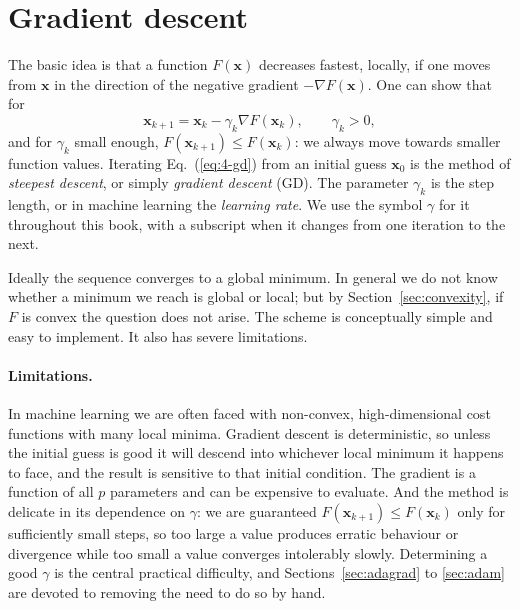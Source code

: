 \section{Gradient descent}
\label{sec:graddescent}

The basic idea is that a function $F(\bm{x})$ decreases fastest, locally, if
one moves from $\bm{x}$ in the direction of the negative gradient
$-\nabla F(\bm{x})$.  One can show that for
\begin{equation}
  \bm{x}_{k+1} = \bm{x}_k - \gamma_k\nabla F(\bm{x}_k),
  \qquad \gamma_k>0,
  \label{eq:4-gd}
\end{equation}
and for $\gamma_k$ small enough, $F(\bm{x}_{k+1})\le F(\bm{x}_k)$: we always
move towards smaller function values.  Iterating Eq.~(\ref{eq:4-gd}) from an
initial guess $\bm{x}_0$ is the method of \emph{steepest descent}, or simply
\emph{gradient descent} (GD).  The parameter $\gamma_k$ is the step length, or
in machine learning the \emph{learning rate}.  We use the symbol $\gamma$
for it throughout this book, with a subscript when it changes from one
iteration to the next.

Ideally the sequence converges to a global minimum.  In general we do not know
whether a minimum we reach is global or local; but by
Section~\ref{sec:convexity}, if $F$ is convex the question does not arise.  The
scheme is conceptually simple and easy to implement.  It also has severe
limitations.

\paragraph{Limitations.}
In machine learning we are often faced with non-convex, high-dimensional cost
functions with many local minima.  Gradient descent is deterministic, so
unless the initial guess is good it will descend into whichever local minimum
it happens to face, and the result is sensitive to that initial condition.
The gradient is a function of all $p$ parameters and can be expensive to
evaluate.  And the method is delicate in its dependence on $\gamma$: we are
guaranteed $F(\bm{x}_{k+1})\le F(\bm{x}_k)$ only for sufficiently small steps,
so too large a value produces erratic behaviour or divergence while too small
a value converges intolerably slowly.  Determining a good $\gamma$ is the
central practical difficulty, and Sections~\ref{sec:adagrad} to
\ref{sec:adam} are devoted to removing the need to do so by hand.

